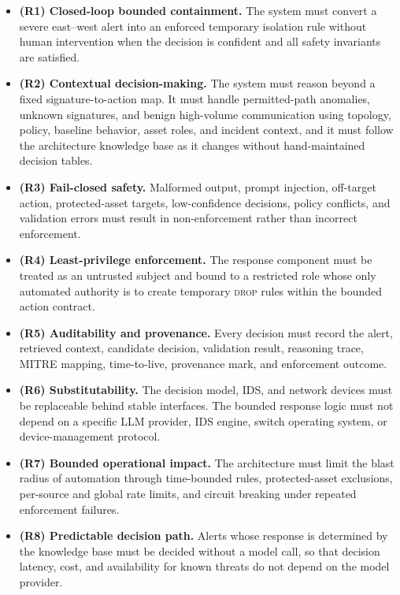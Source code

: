 \documentclass[final,5p]{elsarticle}
\begin{document}
\begin{itemize}
    \item \textbf{(R1) Closed-loop bounded containment.} The system must convert a severe east--west alert into an enforced temporary isolation rule without human intervention when the decision is confident and all safety invariants are satisfied.

    \item \textbf{(R2) Contextual decision-making.} The system must reason beyond a fixed signature-to-action map. It must handle permitted-path anomalies, unknown signatures, and benign high-volume communication using topology, policy, baseline behavior, asset roles, and incident context, and it must follow the architecture knowledge base as it changes without hand-maintained decision tables.

    \item \textbf{(R3) Fail-closed safety.} Malformed output, prompt injection, off-target action, protected-asset targets, low-confidence decisions, policy conflicts, and validation errors must result in non-enforcement rather than incorrect enforcement.

    \item \textbf{(R4) Least-privilege enforcement.} The response component must be treated as an untrusted subject and bound to a restricted role whose only automated authority is to create temporary \textsc{drop} rules within the bounded action contract.

    \item \textbf{(R5) Auditability and provenance.} Every decision must record the alert, retrieved context, candidate decision, validation result, reasoning trace, MITRE mapping, time-to-live, provenance mark, and enforcement outcome.

    \item \textbf{(R6) Substitutability.} The decision model, IDS, and network devices must be replaceable behind stable interfaces. The bounded response logic must not depend on a specific LLM provider, IDS engine, switch operating system, or device-management protocol.

    \item \textbf{(R7) Bounded operational impact.} The architecture must limit the blast radius of automation through time-bounded rules, protected-asset exclusions, per-source and global rate limits, and circuit breaking under repeated enforcement failures.

    \item \textbf{(R8) Predictable decision path.} Alerts whose response is determined by the knowledge base must be decided without a model call, so that decision latency, cost, and availability for known threats do not depend on the model provider.
\end{itemize}
\end{document}
